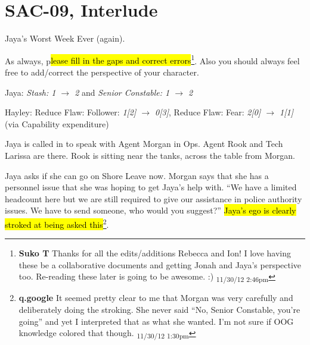 \setcounter{chapter}{ 10 }
\chapter{\textbf{SAC-09, Interlude} }







Jaya's Worst Week Ever (again).  



As always, p\hl{lease fill in the gaps and correct errors}\footnote{\textbf{Suko T }Thanks for all the edits/additions Rebecca and Ion!  I love having these be a collaborative documents and getting Jonah and Jaya's perspective too.  Re-reading these later is going to be awesome.  :) \textsubscript{11/30/12 2:46pm}}.  Also you should always feel free to add/correct the perspective of your character.


Jaya: \textit{Stash: 1 $\rightarrow$ 2} and \textit{Senior Constable: 1 $\rightarrow$ 2}

Hayley: Reduce Flaw: Follower: \textit{1{[}2{]} $\rightarrow$ 0{[}3{]}}, Reduce Flaw: Fear: \textit{2{[}0{]} $\rightarrow$ 1{[}1{]}} (via Capability expenditure)




Jaya is called in to speak with Agent Morgan in Ops.  Agent Rook and Tech Larissa are there.  Rook is sitting near the tanks, across the table from Morgan.



Jaya asks if she can go on Shore Leave now.  Morgan says that she has a personnel issue that she was hoping to get Jaya's help with.  ``We have a limited headcount here but we are still required to give our assistance in police authority issues.  We have to send someone, who would you suggest?''  \hl{Jaya's ego is clearly stroked at being asked this}\footnote{\textbf{q.google }It seemed pretty clear to me that Morgan was very carefully and deliberately doing the stroking.  She never said ``No, Senior Constable, you're going'' and yet I interpreted that as what she wanted.  I'm not sure if OOG knowledge colored that though. \textsubscript{11/30/12 1:30pm}}.



